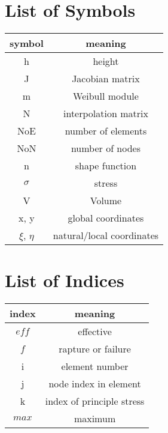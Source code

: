 \section*{List of Symbols}
\begin{table}[H]
    \centering
\begin{tabular}{c | c } 
    \toprule
    \textbf{symbol} & \textbf{meaning} \\ [0.5ex] 
    \midrule
    h & height\\
    J & Jacobian matrix\\
    m & Weibull module\\
    N & interpolation matrix\\
    NoE & number of elements\\
    NoN & number of nodes\\
    n & shape function\\
    $\sigma$ & stress\\
    V & Volume\\ 
    x, y & global coordinates\\
    $\xi$, $\eta$ & natural/local coordinates\\[1ex]
    \bottomrule
\end{tabular}
\end{table}

\section*{List of Indices}
\begin{table}[H]
    \centering
\begin{tabular}{c | c} 
    \toprule
\textbf{index} & \textbf{meaning} \\ [0.5ex] 
\midrule
$eff$ & effective\\
$f$ & rapture or failure\\
i & element number\\
j & node index in element\\
k & index of principle stress\\
$max$ & maximum\\ [1ex] 
\bottomrule
\end{tabular}
\end{table}